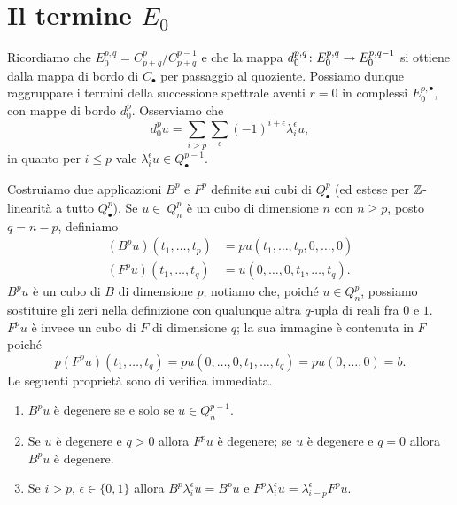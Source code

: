 \section{Il termine \texorpdfstring{\(E_0\)}{E0}}
Ricordiamo che \(E^{p,q}_0=C^p_{p+q}/C^{p-1}_{p+q}\) e che la mappa \(\map{d^{p,q}_0}{E^{p,q}_0}{E^{p,q-1}_0}\) si ottiene dalla mappa di bordo di \(C_\bullet\) per passaggio al quoziente. Possiamo dunque raggruppare i termini della successione spettrale aventi \(r=0\) in complessi \(E^{p,\bullet}_0\), con mappe di bordo \(d^p_0\). Osserviamo che
\[
d^p_0u=\sum_{i>p}\sum_\epsilon(-1)^{i+\epsilon}\lambda^\epsilon_iu,
\]
in quanto per \(i\le p\) vale \(\lambda^\epsilon_iu\in Q^{p-1}_\bullet\).


Costruiamo due applicazioni \(B^p\) e \(F^p\) definite sui cubi di \(Q^p_\bullet\) (ed estese per \(\mathbb{Z}\)-linearità a tutto \(Q^p_\bullet\)). Se \(u\in\ Q^p_n\) è un cubo di dimensione \(n\) con \(n\ge p\), posto \(q=n-p\), definiamo
\begin{align*}
(B^pu)(t_1,\ldots,t_p)&=pu(t_1,\ldots,t_p,0,\ldots,0)\\
(F^pu)(t_1,\ldots,t_q)&=u(0,\ldots,0,t_1,\ldots,t_q).
\end{align*}
\(B^pu\) è un cubo di \(B\) di dimensione \(p\); notiamo che, poiché \(u\in Q^p_n\), possiamo sostituire gli zeri nella definizione con qualunque altra \(q\)-upla di reali fra \(0\) e \(1\). \(F^pu\) è invece un cubo di \(F\) di dimensione \(q\); la sua immagine è contenuta in \(F\) poiché
\[
p(F^pu)(t_1,\ldots,t_q)=pu(0,\ldots,0,t_1,\ldots,t_q)=pu(0,\ldots,0)=b.
\]
Le seguenti proprietà sono di verifica immediata.
\begin{enumerate}
\item\label{spectral-sequence-of-fibration:pr1} \(B^pu\) è degenere se e solo se \(u\in Q^{p-1}_n\).
\item\label{spectral-sequence-of-fibration:pr2} Se \(u\) è degenere e \(q>0\) allora \(F^pu\) è degenere; se \(u\) è degenere e \(q=0\) allora \(B^pu\) è degenere.
\item\label{spectral-sequence-of-fibration:pr3} Se \(i>p\), \(\epsilon\in\{0,1\}\) allora \(B^p\lambda^\epsilon_iu=B^pu\) e \(F^p\lambda^\epsilon_iu=\lambda^\epsilon_{i-p}F^pu\).
\end{enumerate}

